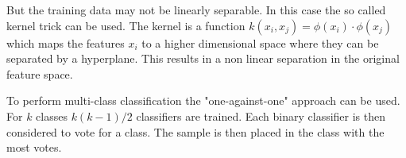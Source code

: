 But the training data may not be linearly separable. In this case the so called kernel trick can be used. The kernel is a function \(k\left ( x_{i}, x_{j} \right )=\phi \left ( x_{i} \right )\cdot \phi\left ( x_{j} \right )\) which maps the features \(x_{i}\) to a higher dimensional space where they can be separated by a hyperplane. This results in a non linear separation in the original feature space\cite{ErikKimKernelTrick}.

To perform multi-class classification the "one-against-one" approach can be used. For \(k\) classes \(k\left ( k-1 \right )/2\) classifiers are trained. Each binary classifier is then considered to vote for a class. The sample is then placed in the class with the most votes\cite{chang2011libsvm}.